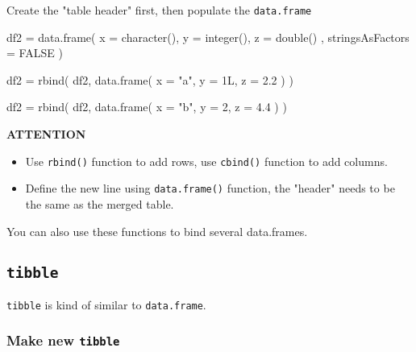 \documentclass[
]{article}
\newenvironment{Shaded}{}{}
\newcommand{\AttributeTok}[1]{\textcolor[rgb]{0.49,0.56,0.16}{#1}}
\newcommand{\ConstantTok}[1]{\textcolor[rgb]{0.53,0.00,0.00}{#1}}
\newcommand{\DecValTok}[1]{\textcolor[rgb]{0.25,0.63,0.44}{#1}}
\newcommand{\FloatTok}[1]{\textcolor[rgb]{0.25,0.63,0.44}{#1}}
\newcommand{\FunctionTok}[1]{\textcolor[rgb]{0.02,0.16,0.49}{#1}}
\newcommand{\NormalTok}[1]{#1}
\newcommand{\OtherTok}[1]{\textcolor[rgb]{0.00,0.44,0.13}{#1}}
\newcommand{\StringTok}[1]{\textcolor[rgb]{0.25,0.44,0.63}{#1}}
\begin{document}
Create the "table header" first, then populate the \texttt{data.frame}

\begin{Shaded}
\begin{Highlighting}[]
\NormalTok{df2 }\OtherTok{=}
	\FunctionTok{data.frame}\NormalTok{( }
    \AttributeTok{x =} \FunctionTok{character}\NormalTok{(), }
    \AttributeTok{y =} \FunctionTok{integer}\NormalTok{(), }
    \AttributeTok{z =} \FunctionTok{double}\NormalTok{() , }
    \AttributeTok{stringsAsFactors =} \ConstantTok{FALSE} 
\NormalTok{  )}

\NormalTok{df2 }\OtherTok{=}
	\FunctionTok{rbind}\NormalTok{( }
\NormalTok{    df2, }
    \FunctionTok{data.frame}\NormalTok{(}
      \AttributeTok{x =} \StringTok{"a"}\NormalTok{,}
      \AttributeTok{y =}\NormalTok{ 1L, }
      \AttributeTok{z =} \FloatTok{2.2} 
\NormalTok{    ) }
\NormalTok{  )}

\NormalTok{df2 }\OtherTok{=}
	\FunctionTok{rbind}\NormalTok{( }
\NormalTok{    df2, }
    \FunctionTok{data.frame}\NormalTok{( }
      \AttributeTok{x =} \StringTok{"b"}\NormalTok{, }
      \AttributeTok{y =} \DecValTok{2}\NormalTok{, }
      \AttributeTok{z =} \FloatTok{4.4} 
\NormalTok{    ) }
\NormalTok{  )}
\end{Highlighting}
\end{Shaded}

\textbf{ATTENTION}

\begin{itemize}
\item
  Use \texttt{rbind()} function to add rows, use \texttt{cbind()}
  function to add columns.
\item
  Define the new line using \texttt{data.frame()} function, the "header"
  needs to be the same as the merged table.
\end{itemize}

You can also use these functions to bind several data.frames.

\hypertarget{tibble}{%
\subsection{\texorpdfstring{\texttt{tibble}}{tibble}}\label{tibble}}

\texttt{tibble} is kind of similar to \texttt{data.frame}.

\hypertarget{make-new-tibble}{%
\subsubsection{\texorpdfstring{Make new
\texttt{tibble}}{Make new tibble}}\label{make-new-tibble}}
\end{document}
